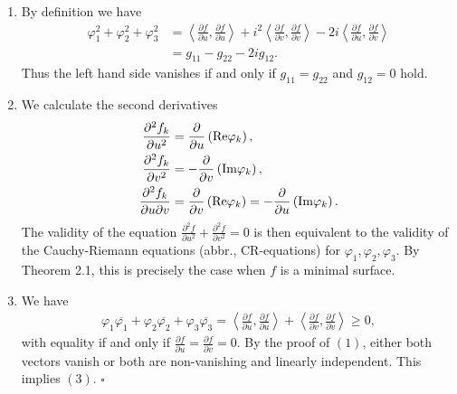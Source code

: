 \documentclass[a4paper]{article}
\numberwithin{equation}{section}
\begin{document}
\begin{enumerate}
\item By definition we have
\begin{align}
\varphi _1^2 + \varphi _2^2 + \varphi _3^2 &= \left\langle {\frac{{\partial f}}{{\partial u}},\frac{{\partial f}}{{\partial u}}} \right\rangle  + {i^2}\left\langle {\frac{{\partial f}}{{\partial v}},\frac{{\partial f}}{{\partial v}}} \right\rangle  - 2i\left\langle {\frac{{\partial f}}{{\partial u}},\frac{{\partial f}}{{\partial v}}} \right\rangle \\
 &= {g_{11}} - {g_{22}} - 2i{g_{12}}.
\end{align}
Thus the left hand side vanishes if and only if $g_{11}=g_{22}$ and $g_{12}=0$ hold.
\item We calculate the second derivatives
\begin{align}
\frac{{{\partial ^2}{f_k}}}{{\partial {u^2}}} &= \frac{\partial }{{\partial u}}\left( {{\mathop{\rm Re}\nolimits} {\varphi _k}} \right),\\
\frac{{{\partial ^2}{f_k}}}{{\partial {v^2}}} &=  - \frac{\partial }{{\partial v}}\left( {{\mathop{\rm Im}\nolimits} {\varphi _k}} \right),\\
\frac{{{\partial ^2}{f_k}}}{{\partial u\partial v}} &= \frac{\partial }{{\partial v}}\left( {{\mathop{\rm Re}\nolimits} {\varphi _k}} \right) =  - \frac{\partial }{{\partial u}}\left( {{\mathop{\rm Im}\nolimits} {\varphi _k}} \right).
\end{align}
The validity of the equation $\frac{{{\partial ^2}f}}{{\partial {u^2}}} + \frac{{{\partial ^2}f}}{{\partial {v^2}}} = 0$ is then equivalent to the validity of the Cauchy-Riemann equations (abbr., CR-equations) for $\varphi _1,\varphi _2,\varphi _3$. By Theorem 2.1, this is precisely the case when $f$ is a minimal surface.
\item We have 
\begin{align}
{\varphi _1}\overline {{\varphi _1}}  + {\varphi _2}\overline {{\varphi _2}}  + {\varphi _3}\overline {{\varphi _3}}  = \left\langle {\frac{{\partial f}}{{\partial u}},\frac{{\partial f}}{{\partial u}}} \right\rangle  + \left\langle {\frac{{\partial f}}{{\partial v}},\frac{{\partial f}}{{\partial v}}} \right\rangle  \ge 0,
\end{align}
with equality if and only if $\frac{{\partial f}}{{\partial u}} = \frac{{\partial f}}{{\partial v}} = 0$. By the proof of $\left(1\right)$, either both vectors vanish or both are non-vanishing and linearly independent. This implies $\left(3\right)$. \hfill $\square$
\end{enumerate} 
\end{document}
